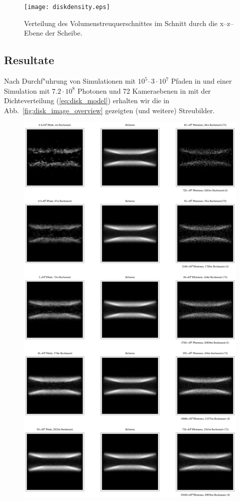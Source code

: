 		\begin{figure}
			\centering
			\texttt{[image: diskdensity.eps]}
			\caption{Verteilung des Volumenstreuquerschnittes im Schnitt durch die x--z--Ebene der Scheibe.}
			\label{fig:diskdensity}
		\end{figure}
	
	\subsection{Resultate}
		Nach Durchf"uhrung von Simulationen mit $10^5$--$3\cdot 10^7$ Pfaden in \pirate und einer Simulation mit $7.2\cdot 10^8$ Photonen und 72 Kameraebenen in \mctd mit der Dichteverteilung (\ref{eq:disk_model}) erhalten wir die in Abb.~\ref{fig:disk_image_overview} gezeigten (und weitere) Streubilder.
		
		\begin{figure}
			\centering
			\includegraphics[height=1.0\textheight]{diskimageoverview.eps}

\end{figure}
